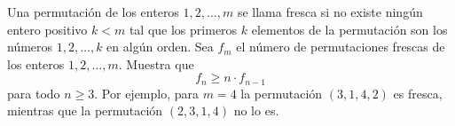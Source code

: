 Una permutación de los enteros $1, 2, \dots , m$ se llama fresca si no existe ningún entero
positivo $k \lt m$ tal que los primeros $k$ elementos de la permutación son los números $1, 2, \dots , k$ en
algún orden. Sea $f_m$ el número de permutaciones frescas de los enteros $1, 2, \dots , m.$
Muestra que \[f_n \ge n \cdot f_{n−1}\] para todo $n \ge 3$.
Por ejemplo, para $m = 4$ la permutación $(3, 1, 4, 2)$ es fresca, mientras que la permutación $(2, 3, 1, 4)$
no lo es.